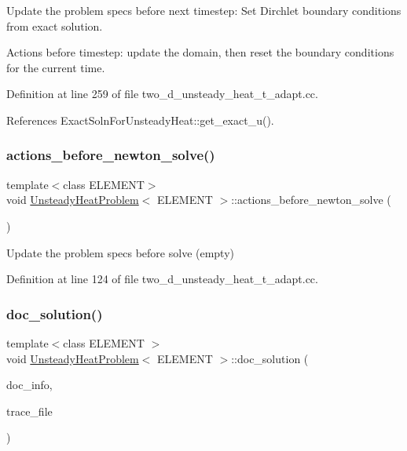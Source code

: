 Update the problem specs before next timestep\+: Set Dirchlet boundary conditions from exact solution. 

Actions before timestep\+: update the domain, then reset the boundary conditions for the current time. 

Definition at line 259 of file two\+\_\+d\+\_\+unsteady\+\_\+heat\+\_\+t\+\_\+adapt.\+cc.



References Exact\+Soln\+For\+Unsteady\+Heat\+::get\+\_\+exact\+\_\+u().

\mbox{\label{classUnsteadyHeatProblem_aa1ee8fbe2a5439d1cacb37131e0f81c6}} 
\subsubsection{\texorpdfstring{actions\+\_\+before\+\_\+newton\+\_\+solve()}{actions\_before\_newton\_solve()}}
{\footnotesize\ttfamily template$<$class E\+L\+E\+M\+E\+NT$>$ \\
void \hyperlink{classUnsteadyHeatProblem}{Unsteady\+Heat\+Problem}$<$ E\+L\+E\+M\+E\+NT $>$\+::actions\+\_\+before\+\_\+newton\+\_\+solve (\begin{DoxyParamCaption}{ }\end{DoxyParamCaption})\hspace{0.3cm}{\ttfamily [inline]}}



Update the problem specs before solve (empty) 



Definition at line 124 of file two\+\_\+d\+\_\+unsteady\+\_\+heat\+\_\+t\+\_\+adapt.\+cc.

\mbox{\label{classUnsteadyHeatProblem_a2c0c4b762d2dbde7396dca2a6750f433}} 
\subsubsection{\texorpdfstring{doc\+\_\+solution()}{doc\_solution()}}
{\footnotesize\ttfamily template$<$class E\+L\+E\+M\+E\+NT $>$ \\
void \hyperlink{classUnsteadyHeatProblem}{Unsteady\+Heat\+Problem}$<$ E\+L\+E\+M\+E\+NT $>$\+::doc\+\_\+solution (\begin{DoxyParamCaption}\item[{Doc\+Info \&}]{doc\+\_\+info,  }\item[{ofstream \&}]{trace\+\_\+file }\end{DoxyParamCaption})}



